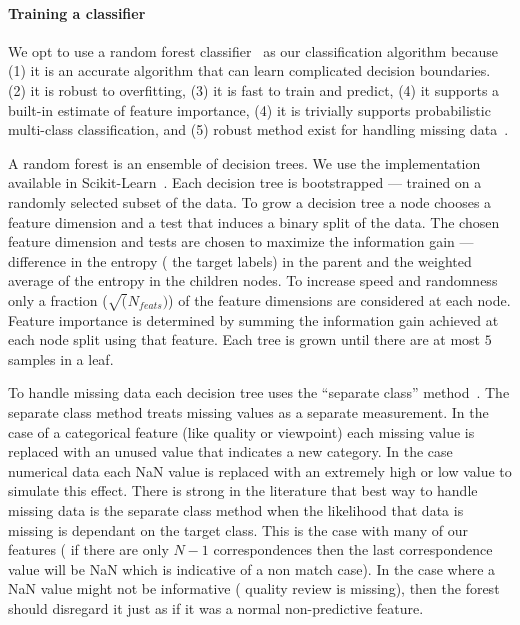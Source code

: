 \paragraph{Training a classifier}
 
We opt to use a random forest
  classifier~\cite{ho_random_1995,amit_shape_1997,breiman_random_2001} as our
  classification algorithm because
(1) it is an accurate algorithm that can learn complicated decision
  boundaries.
(2) it is robust to overfitting,
(3) it is fast to train and predict,
(4) it supports a built-in estimate of feature importance,
(4) it is trivially supports probabilistic multi-class classification, and
(5) robust method exist for handling missing
  data~\cite{ding_investigation_2010}.

A random forest is an ensemble of decision trees.
We use the implementation available in
  Scikit-Learn~\cite{pedregosa_scikit-learn_2011}.
Each decision tree is bootstrapped --- \ie{} trained on a randomly selected
  subset of the data.
To grow a decision tree a node chooses a feature dimension and a test that
  induces a binary split of the data.
The chosen feature dimension and tests are chosen to maximize the information
  gain --- \ie{} difference in the entropy (\wrt{} the target labels) in the
  parent and the weighted average of the entropy in the children nodes.
To increase speed and randomness only a fraction ($\sqrt(N_{feats})$) of the
  feature dimensions are considered at each node.
Feature importance is determined by summing the information gain achieved at
  each node split using that feature.
Each tree is grown until there are at most $5$ samples in a leaf.

To handle missing data each decision tree uses the ``separate class''
  method~\cite{ding_investigation_2010}.
The separate class method treats missing values as a separate measurement.
In the case of a categorical feature (like quality or viewpoint) each missing
  value is replaced with an unused value that indicates a new category.
In the case numerical data each NaN value is replaced with an extremely high
  or low value to simulate this effect.
There is strong in the literature that best way to handle missing data is the
  separate class method when the likelihood that data is missing is dependant on
  the target class.
This is the case with many of our features (\eg{} if there are only $N-1$
  correspondences then the last correspondence value will be NaN which is
  indicative of a non match case).
In the case where a NaN value might not be informative (\eg{} quality review
  is missing), then the forest should disregard it just as if it was a normal
  non-predictive feature.

